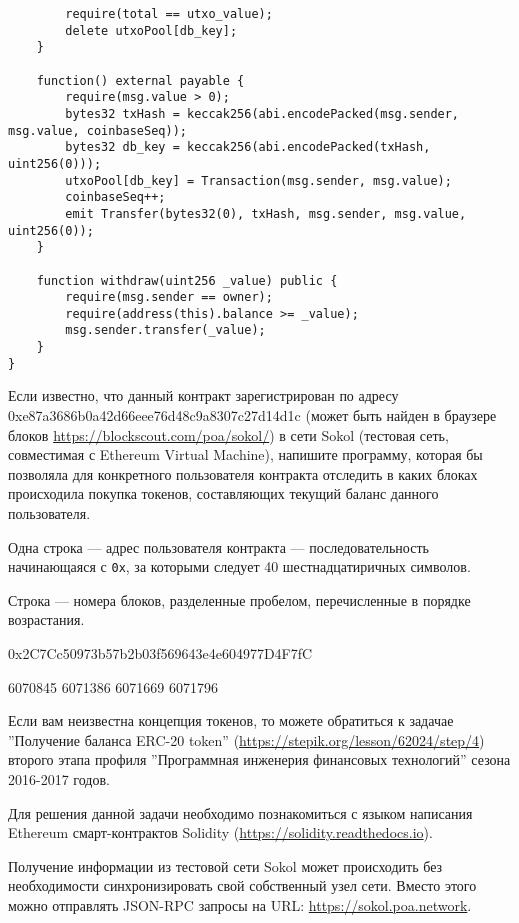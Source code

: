 \begin{verbatim}
        require(total == utxo_value);
        delete utxoPool[db_key];
    }
   
    function() external payable {
        require(msg.value > 0);
        bytes32 txHash = keccak256(abi.encodePacked(msg.sender, msg.value, coinbaseSeq));
        bytes32 db_key = keccak256(abi.encodePacked(txHash, uint256(0)));
        utxoPool[db_key] = Transaction(msg.sender, msg.value);
        coinbaseSeq++;
        emit Transfer(bytes32(0), txHash, msg.sender, msg.value, uint256(0));
    }
    
    function withdraw(uint256 _value) public {
        require(msg.sender == owner);
        require(address(this).balance >= _value);
        msg.sender.transfer(_value);
    }
}
\end{verbatim}

Если известно, что данный контракт зарегистрирован по адресу \newline 0xe87a3686b0a42d66eee76d48c9a8307c27d14d1c (может быть найден в браузере блоков \url{https://blockscout.com/poa/sokol/}) в сети Sokol (тестовая сеть, совместимая с Ethereum Virtual Machine), напишите программу, которая бы позволяла для конкретного пользователя контракта отследить в каких блоках происходила покупка токенов, составляющих текущий баланс данного пользователя.  


Одна строка --- адрес пользователя контракта --- последовательность начинающаяся с \texttt{0x}, за которыми следует 40 шестнадцатиричных символов.

\outputfmtSection

Строка --- номера блоков, разделенные пробелом, перечисленные в порядке возрастания.

\exampleSection


\begin{myverbbox}[\small]{\vinput}
0x2C7Cc50973b57b2b03f569643e4e604977D4F7fC
\end{myverbbox}
\begin{myverbbox}[\small]{\voutput}
6070845 6071386 6071669 6071796
\end{myverbbox}

\commentsSection
Если вам неизвестна концепция токенов, то можете обратиться к задачае ''Получение баланса ERC-20 token'' (\url{https://stepik.org/lesson/62024/step/4}) второго этапа профиля ''Программная инженерия финансовых технологий'' сезона 2016-2017 годов.

Для решения данной задачи необходимо познакомиться с языком написания Ethereum смарт-контрактов Solidity (\url{https://solidity.readthedocs.io}).

Получение информации из тестовой сети Sokol может происходить без необходимости синхронизировать свой собственный узел сети. Вместо этого можно отправлять JSON-RPC запросы на URL: \url{https://sokol.poa.network}. 

